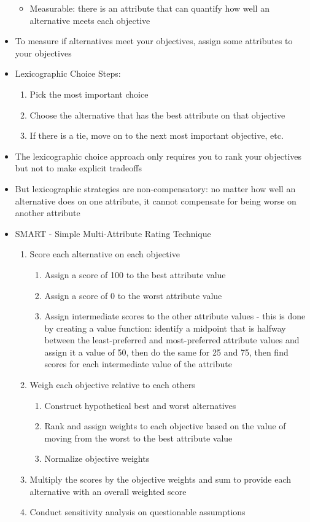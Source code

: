 \documentclass[12pt]{article}
\begin{document}
\begin{itemize}
\begin{itemize}
\item Measurable: there is an attribute that can quantify how well an alternative meets each objective
\end{itemize} 
\item To measure if alternatives meet your objectives, assign some attributes to your objectives 
\item Lexicographic Choice Steps: \begin{enumerate} 
\item Pick the most important choice 
\item Choose the alternative that has the best attribute on that objective 
\item If there is a tie, move on to the next most important objective, etc. \end{enumerate} 
\item The lexicographic choice approach only requires you to rank your objectives but not to make explicit tradeoffs 
\item But lexicographic strategies are non-compensatory: no matter how well an alternative does on one attribute, it cannot compensate for being worse on another attribute 
\item SMART - Simple Multi-Attribute Rating Technique \begin{enumerate} 
\item Score each alternative on each objective \begin{enumerate} 
\item Assign a score of 100 to the best attribute value
\item Assign a score of 0 to the worst attribute value 
\item Assign intermediate scores to the other attribute values - this is done by creating a value function: identify a midpoint that is halfway between the least-preferred and most-preferred attribute values and assign it a value of 50, then do the same for 25 and 75, then find scores for each intermediate value of the attribute \end{enumerate}
\item Weigh each objective relative to each others \begin{enumerate} 
\item Construct hypothetical best and worst alternatives 
\item Rank and assign weights to each objective based on the value of moving from the worst to the best attribute value 
\item Normalize objective weights \end{enumerate}
\item Multiply the scores by the objective weights and sum to provide each alternative with an overall weighted score 
\item Conduct sensitivity analysis on questionable assumptions \end{enumerate} 
\end{itemize} 
\newpage
\end{document}
